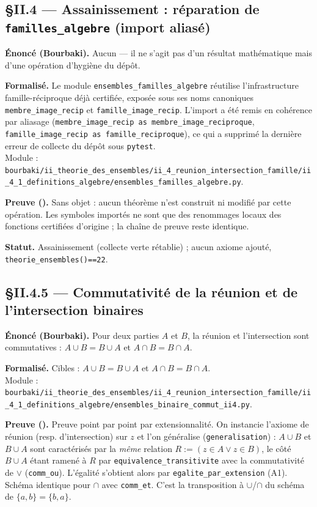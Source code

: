 \subsection{§II.4 --- Assainissement : réparation de \texttt{familles\_algebre} (import aliasé)}
\textbf{Énoncé (Bourbaki).} Aucun --- il ne s'agit pas d'un résultat mathématique mais d'une opération
d'hygiène du dépôt.

\textbf{Formalisé.} Le module \texttt{ensembles\_familles\_algebre} réutilise l'infrastructure
famille-réciproque déjà certifiée, exposée sous ses noms canoniques \texttt{membre\_image\_recip} et
\texttt{famille\_image\_recip}. L'import a été remis en cohérence par aliasage
(\texttt{membre\_image\_recip as membre\_image\_reciproque}, \texttt{famille\_image\_recip as famille\_reciproque}),
ce qui a supprimé la dernière erreur de collecte du dépôt sous \texttt{pytest}. \\
Module : \texttt{bourbaki/ii\_theorie\_des\_ensembles/ii\_4\_reunion\_intersection\_famille/ii\_4\_1\_definitions\_algebre/ensembles\_familles\_algebre.py}.

\textbf{Preuve (\Nstar).} Sans objet : aucun théorème n'est construit ni modifié par cette opération.
Les symboles importés ne sont que des renommages locaux des fonctions certifiées d'origine ; la chaîne
de preuve reste identique.

\textbf{Statut.} Assainissement (collecte verte rétablie) ; aucun axiome ajouté,
\texttt{theorie\_ensembles()==22}.


\subsection{§II.4.5 --- Commutativité de la réunion et de l'intersection binaires}
\textbf{Énoncé (Bourbaki).} Pour deux parties $A$ et $B$, la réunion et l'intersection sont
commutatives : $A \cup B = B \cup A$ et $A \cap B = B \cap A$.

\textbf{Formalisé.} Cibles : $A \cup B = B \cup A$ et $A \cap B = B \cap A$. \\
Module : \texttt{bourbaki/ii\_theorie\_des\_ensembles/ii\_4\_reunion\_intersection\_famille/ii\_4\_1\_definitions\_algebre/ensembles\_binaire\_commut\_ii4.py}.

\textbf{Preuve (\Nstar).} Preuve point par point par extensionnalité. On instancie l'axiome de réunion
(resp. d'intersection) sur $z$ et l'on généralise (\texttt{generalisation}) : $A\cup B$ et $B\cup A$
sont caractérisés par la \emph{même} relation $R := (z\in A \vee z\in B)$, le côté $B\cup A$ étant
ramené à $R$ par \texttt{equivalence\_transitivite} avec la commutativité de $\vee$ (\texttt{comm\_ou}).
L'égalité s'obtient alors par \texttt{egalite\_par\_extension} (A1). Schéma identique pour $\cap$ avec
\texttt{comm\_et}. C'est la transposition à $\cup$/$\cap$ du schéma de $\{a,b\}=\{b,a\}$.

